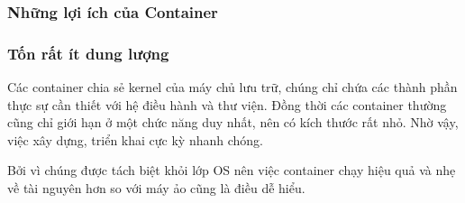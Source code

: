 \documentclass[14pt,a4paper]{report}
\begin{document}
	\subsubsection{Những lợi ích của Container}
	\subsubsection{Tốn rất ít dung lượng}
	\hspace{1cm}Các container chia sẻ kernel của máy chủ lưu trữ, chúng chỉ chứa các thành phần thực sự cần thiết với hệ điều hành và thư viện. Đồng thời các container thường cũng chỉ giới hạn ở một chức năng duy nhất, nên có kích thước rất nhỏ. Nhờ vậy, việc xây dựng, triển khai cực kỳ nhanh chóng.
	
	\hspace{0.3cm}Bởi vì chúng được tách biệt khỏi lớp OS nên việc container chạy hiệu quả và nhẹ về tài nguyên hơn so với máy ảo cũng là điều dễ hiểu.
\end{document}
